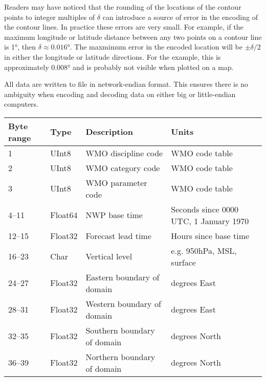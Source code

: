 \documentclass[12pt,a4paper]{article}
\begin{document}
Readers may have noticed that the rounding of the locations of the contour
points to integer multiples of $\delta$ can introduce a source of error in the
encoding of the contour lines. In practice these errors are very small. For
example, if the maximum longitude or latitude distance between any two points
on a contour line is \ang{1}, then $\delta \approx \ang{0.016}$. The maxmimum
error in the encoded location will be $\pm \delta/2$ in either the longitude or
latitude directions. For the example, this is approximately \ang{0.008} and is
probably not visible when plotted on a map.

All data are written to file in network-endian format. This ensures there is no
ambiguity when encoding and decoding data on either big or little-endian
computers. 

\begin{table*}
\centering
\begin{tabular}{llll} \hline
Byte range  & Type      & Description                    & Units \\ \hline
1           & UInt8     & WMO discipline code            & WMO code table~\citep[Table 0.0]{wmo2014}  \\
2           & UInt8     & WMO category code              & WMO code table~\citep[Table 4.1]{wmo2014}  \\
3           & UInt8     & WMO parameter code             & WMO code table~\citep[Table 4.2]{wmo2014}  \\
4--11       & Float64   & NWP base time                  & Seconds since 0000\,UTC, 1 January 1970    \\
12--15      & Float32   & Forecast lead time             & Hours since base time                      \\ 
16--23      & Char      & Vertical level                 & e.g. 950hPa, MSL, surface                  \\
24--27      & Float32   & Eastern boundary of domain     & degrees East                               \\
28--31      & Float32   & Western boundary of domain     & degrees East                               \\
32--35      & Float32   & Southern boundary of domain    & degrees North                              \\
36--39      & Float32   & Northern boundary of domain    & degrees North                              \\ \hline
\end{tabular}
\caption{\label{tab:header_record}Format of the header record. The data types
in Tables~\ref{tab:header_record}~and~\ref{tab:contour_record} are: UInt8 and
UInt16 are 8 and 16-bit unsigned integers; SInt8 are 8-bit signed integers;
Float32 and Float64 are IEEE 32 and 64-bit floating-point numbers; Char is a
one-byte character.}
\end{table*}
\end{document}
